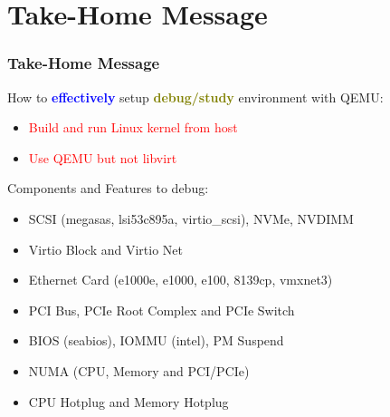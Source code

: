 \documentclass[aspectratio=169]{beamer}
\begin{document}

\section{Take-Home Message}
\begin{frame}
\frametitle{Take-Home Message}
{\Large How to \textbf{\textcolor{blue}{effectively}} setup \textbf{\textcolor{olive}{debug/study}} environment with QEMU:}
\begin{itemize}
\item {\Large \textcolor{red}{Build and run Linux kernel from host}}
\item {\Large \textcolor{red}{Use QEMU but not libvirt}}
\end{itemize}

\vspace{4 mm}

{\Large Components and Features to debug:}
\begin{itemize}
\item SCSI (megasas, lsi53c895a, virtio\_scsi), NVMe, NVDIMM
\item Virtio Block and Virtio Net
\item Ethernet Card (e1000e, e1000, e100, 8139cp, vmxnet3)
\item PCI Bus, PCIe Root Complex and PCIe Switch
\item BIOS (seabios), IOMMU (intel), PM Suspend
\item NUMA (CPU, Memory and PCI/PCIe)
\item CPU Hotplug and Memory Hotplug
\end{itemize}
\end{frame}

\end{document}
